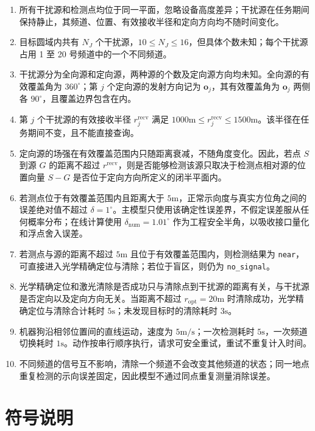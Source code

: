\begin{enumerate}
\item 所有干扰源和检测点均位于同一平面，忽略设备高度差异；干扰源在任务期间保持静止，其频道、位置、有效接收半径和定向方向均不随时间变化。
\item 目标圆域内共有 $N_J$ 个干扰源，$10\le N_J\le16$，但具体个数未知；每个干扰源占用 1 至 20 号频道中的一个不同频道。
\item 干扰源分为全向源和定向源，两种源的个数及定向源方向均未知。全向源的有效覆盖角为 $360^\circ$；第 $j$ 个定向源的发射方向记为 $\boldsymbol o_j$，其有效覆盖角为 $\boldsymbol o_j$ 两侧各 $90^\circ$，且覆盖边界包含在内。
\item 第 $j$ 个干扰源的有效接收半径 $r_j^{\mathrm{recv}}$ 满足 $1000\mathrm{m}\le r_j^{\mathrm{recv}}\le1500\mathrm{m}$。该半径在任务期间不变，且不能直接查询。
\item 定向源的场强在有效覆盖范围内只随距离衰减，不随角度变化。因此，若点 $S$ 到源 $G$ 的距离不超过 $r^{\mathrm{recv}}$，则是否能够检测该源只取决于检测点相对源的位置向量 $S-G$ 是否位于定向方向所定义的闭半平面内。
\item 若测点位于有效覆盖范围内且距离大于 $5\mathrm{m}$，正常示向度与真实方位角之间的误差绝对值不超过 $\delta=1^\circ$。主模型只使用该确定性误差界，不假定误差服从任何概率分布；在线计算使用 $\delta_{\mathrm{num}}=1.01^\circ$ 作为工程安全半角，以吸收接口量化和浮点舍入误差。
\item 若测点与源的距离不超过 $5\mathrm{m}$ 且位于有效覆盖范围内，则检测结果为 \texttt{near}，可直接进入光学精确定位与清除；若位于盲区，则仍为 \texttt{no\_signal}。
\item 光学精确定位和激光清除是否成功只与清除点到干扰源的距离有关，与干扰源是否定向以及定向方向无关。当距离不超过 $r_{\mathrm{opt}}=20\mathrm{m}$ 时清除成功，光学精确定位与清除合计耗时 $5\mathrm{s}$；未发现目标时的清除耗时 $3\mathrm{s}$。
\item 机器狗沿相邻位置间的直线运动，速度为 $5\mathrm{m/s}$；一次检测耗时 $5\mathrm{s}$，一次频道切换耗时 $1\mathrm{s}$。动作按串行顺序执行，请求可安全重试，重试不重复计入时间。
\item 不同频道的信号互不影响，清除一个频道不会改变其他频道的状态；同一地点重复检测的示向误差固定，因此模型不通过同点重复测量消除误差。
\end{enumerate}

\section{符号说明}

